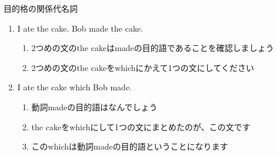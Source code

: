 \documentclass[aspectratio=169,xcolor={dvipsnames,table}]{beamer}
\begin{document}
\begin{frame}[plain]{目的格の関係代名詞}

\dbend%

\bigskip

\begin{enumerate}
 \item<1-> I ate the cake. Bob made the cake.
       \begin{enumerate}
	\item<2-> 2つめの文のthe cakeはmadeの目的語であることを確認しましょう
	\item<3-> 2つめの文のthe cakeをwhichにかえて1つの文にしてください
       \end{enumerate}
 \item<4-> I ate the cake which Bob made.
       \begin{enumerate}
	\item<5-> 動詞madeの目的語はなんでしょう
	\item<6-> the cakeをwhichにして1つの文にまとめたのが、この文です
	\item<7-> このwhichは動詞madeの目的語ということになります
       \end{enumerate}
\end{enumerate}

\end{frame}
\end{document}
